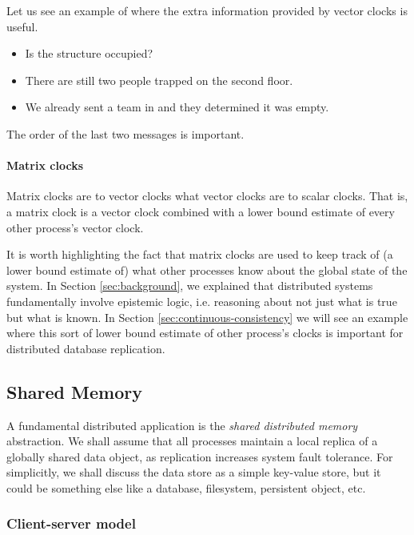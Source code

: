 \documentclass[]             %
{NASA}                       %
\theoremstyle{definition}
\begin{document}
Let us see an example of where the extra information provided by
vector clocks is useful.

\begin{itemize}
\item Is the structure occupied?
\item There are still two people trapped on the second floor.
\item We already sent a team in and they determined it was empty.
\end{itemize}

The order of the last two messages is important.

\paragraph{Matrix clocks}

Matrix clocks are to vector clocks what vector clocks are to scalar
clocks. That is, a matrix clock is a vector clock combined with a
lower bound estimate of every other process's vector clock.

It is worth highlighting the fact that matrix clocks are used to keep
track of (a lower bound estimate of) what other processes know about
the global state of the system. In Section \ref{sec:background}, we
explained that distributed systems fundamentally involve epistemic
logic, i.e. reasoning about not just what is true but what is
known. In Section \ref{sec:continuous-consistency} we will see an
example where this sort of lower bound estimate of other process's
clocks is important for distributed database replication.

\subsection{Shared Memory}

A fundamental distributed application is the \emph{shared distributed
memory} abstraction. We shall assume that all processes maintain a
local replica of a globally shared data object, as replication
increases system fault tolerance. For simplicitly, we shall discuss
the data store as a simple key-value store, but it could be something
else like a database, filesystem, persistent object, etc.

\subsubsection{Client-server model}
\label{ssec:client-server-model}
\end{document}
